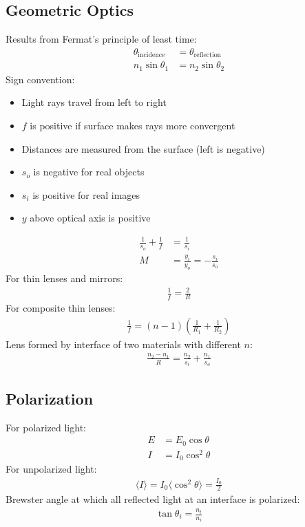 \documentclass[a4paper]{article}
\newcommand{\ave}[1]{
  \ensuremath{\langle #1 \rangle}}     %
\begin{document}
\begin{multicols*}{2}
\subsection{Geometric Optics}
Results from Fermat's principle of least time:
\begin{align*}
  \theta_\text{incidence}&=\theta_\text{reflection} \\
  n_1\sin{\theta_1}&=n_2 \sin{\theta_2}
\end{align*}
Sign convention:
\begin{itemize}
\item Light rays travel from left to right
\item $f$ is positive if surface makes rays more convergent
\item Distances are measured from the surface (left is negative)
\item $s_o$ is negative for real objects
\item $s_i$ is positive for real images
\item $y$ above optical axis is positive
\end{itemize}
\begin{align*}
  \frac{1}{s_{o}} +\frac{1}{f} &=\frac{1}{s_{i}}\\
  M&=\frac{y_i}{y_o}=-\frac{s_i}{s_o}
\end{align*}
For thin lenses and mirrors:
\begin{align*}
  \frac{1}{f} = \frac{2}{R}
\end{align*}
For composite thin lenses:
\begin{align*}
  \frac{1}{f} = (n-1)\left(\frac{1}{R_1} + \frac{1}{R_2}\right)
\end{align*}
Lens formed by interface of two materials with different $n$:
\begin{align*}
  \frac{n_2-n_1}{R} = \frac{n_2}{s_i} + \frac{n_1}{s_o}
\end{align*}
\subsection{Polarization}
For polarized light:
\begin{align*}
  E&=E_0\cos{\theta} \\
  I&=I_0\cos^2{\theta}
\end{align*}
For unpolarized light:
\begin{align*}
  \ave{ I }=I_0 \ave{ \cos^2{\theta} } = \frac{I_0}{2}
\end{align*}
Brewster angle at which all reflected light at an interface is polarized:
\begin{align*}
  \tan{\theta_i}=\frac{n_t}{n_i}
\end{align*}

\end{multicols*}
\end{document}
